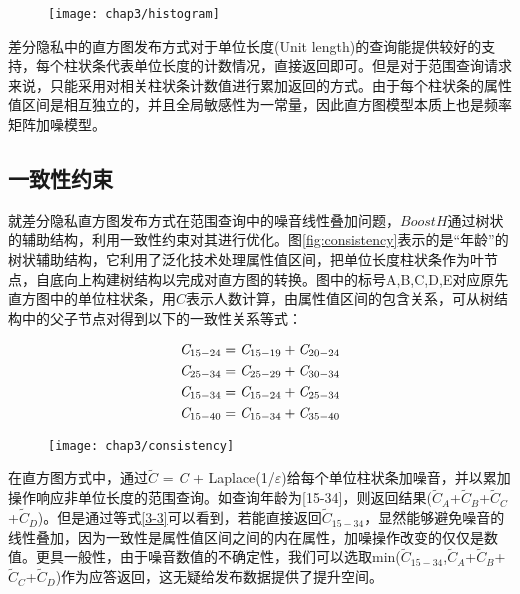 \begin{figure}[!htp]
	\centering
	\texttt{[image: chap3/histogram]}
\end{figure}

差分隐私中的直方图发布方式对于单位长度(Unit length)的查询能提供较好的支持，每个柱状条代表单位长度的计数情况，直接返回即可。但是对于范围查询请求来说，只能采用对相关柱状条计数值进行累加返回的方式。由于每个柱状条的属性值区间是相互独立的，并且全局敏感性为一常量，因此直方图模型本质上也是频率矩阵加噪模型。

\subsection{一致性约束}

就差分隐私直方图发布方式在范围查询中的噪音线性叠加问题，$BoostH$通过树状的辅助结构，利用一致性约束对其进行优化。图\ref{fig:consistency}表示的是“年龄”的树状辅助结构，它利用了泛化技术处理属性值区间，把单位长度柱状条作为叶节点，自底向上构建树结构以完成对直方图的转换。图中的标号A,B,C,D,E对应原先直方图中的单位柱状条，用$C$表示人数计算，由属性值区间的包含关系，可从树结构中的父子节点对得到以下的一致性关系等式：

\begin{eqnarray}
\setcounter{equation}{1}
&{\it{C}}_{15-24} = {\it{C}}_{15-19}+{\it{C}}_{20-24}\\
&{\it{C}}_{25-34} = {\it{C}}_{25-29}+{\it{C}}_{30-34}\\
&\label{3-3}{\it{C}}_{15-34} = {\it{C}}_{15-24}+{\it{C}}_{25-34}\\
&{\it{C}}_{15-40} = {\it{C}}_{15-34}+{\it{C}}_{35-40}
\end{eqnarray}

\begin{figure}[!htp]
	\centering
	\texttt{[image: chap3/consistency]}
\end{figure}

在直方图方式中，通过{$\widetilde{C}$} = {\it{C}} + Laplace(1/$\varepsilon$)给每个单位柱状条加噪音，并以累加操作响应非单位长度的范围查询。如查询年龄为[15-34]，则返回结果({$\widetilde{C}_{A}$}+{$\widetilde{C}_{B}$}+{$\widetilde{C}_{C}$}+{$\widetilde{C}_{D}$})。但是通过等式\ref{3-3}可以看到，若能直接返回{$\widetilde{C}_{15-34}$}，显然能够避免噪音的线性叠加，因为一致性是属性值区间之间的内在属性，加噪操作改变的仅仅是数值。更具一般性，由于噪音数值的不确定性，我们可以选取min({$\widetilde{C}_{15-34}$},{$\widetilde{C}_{A}$}+{$\widetilde{C}_{B}$}+{$\widetilde{C}_{C}$}+{$\widetilde{C}_{D}$})作为应答返回，这无疑给发布数据提供了提升空间。

